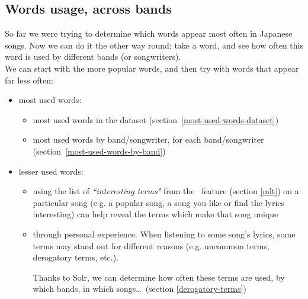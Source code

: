 
\subsection{Words usage, across bands} \label{word-usage}

So far we were trying to determine which words appear most often in Japanese songs. Now we can do it the other way round: take a word, and see how often this word is used by different bands (or songwriters). \\

We can start with the more popular words, and then try with words that appear far less often:

\begin{itemize}
	\item most used words:
	\begin{itemize}
		\item most used words in the dataset (section~\ref{most-used-words-dataset})
		
		\item most used words by band/songwriter, for each band/songwriter (section~\ref{most-used-words-by-band})
	\end{itemize}

	\item lesser used words:
	\begin{itemize}
		\item using the list of \emph{``interesting terms"} from the \MLT\ feature (section \ref{mlt}) on a particular song (e.g. a popular song, a song you like or find the lyrics interesting) can help reveal the terms which make that song unique
				
		\item through personal experience. When listening to some song's lyrics, some terms may stand out for different reasons (e.g. uncommon terms, derogatory terms, etc.). 
		
		Thanks to Solr, we can determine how often these terms are used, by which bands, in which songs\dots\ (section \ref{derogatory-terms})
	\end{itemize}
\end{itemize}





